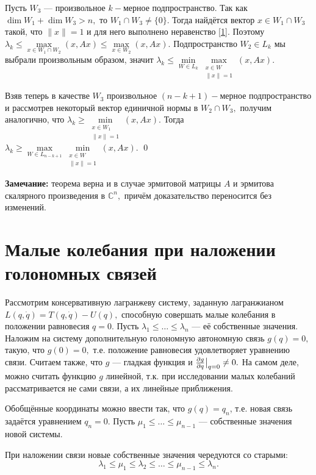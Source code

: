 \documentclass[11pt,a4paper]{article}
\begin{document}
Пусть $W_3$ --- произвольное $k-$мерное подпространство.
Так как $\dim W_1+\dim W_3>n,$ то $W_1\cap W_3\ne\{0\}.$ 
Тогда найдётся вектор $x\in W_1\cap W_3$ такой, что $\|x\|=1$ и 
для него выполнено неравенство \eqref{1}.
Поэтому $\lambda_k\leqslant\max\limits_{x\in W_1\cap W_2}(x,Ax)\leqslant\max\limits_{x\in W_2}(x,Ax).$ 
Подпространство $W_2\in L_k$ мы выбрали произвольным образом, значит $\lambda_k\leqslant\min\limits_{W\in L_{k}}\max\limits_{\substack{x\in W\\\|x\|=1}}(x,Ax).$

Взяв теперь в качестве $W_3$ произвольное $(n-k+1)-$мерное подпространство и рассмотрев некоторый вектор единичной нормы в $W_2\cap W_3,$ получим аналогично, что $\lambda_k\geqslant\min\limits_{\substack{x\in W_1\\\|x\|=1}}(x,Ax).$ Тогда $\lambda_k\geqslant\max\limits_{W\in L_{n-k+1}}\min\limits_{\substack{x\in W\\\|x\|=1}}(x,Ax).$
\qed

\textbf{Замечание:}
теорема верна и в случае эрмитовой матрицы $A$ и эрмитова скалярного произведения в $\mathbb C^n,$ причём доказательство переносится без изменений.
\section{Малые колебания при наложении голономных связей}

Рассмотрим консервативную лагранжеву систему, заданную лагранжианом $L(q,\dot q)=T(q,\dot q)-U(q),$ способную совершать малые колебания в положении равновесия $q=0$. Пусть $\lambda_1\leqslant\ldots\leqslant\lambda_n$ --- её собственные значения. Наложим на систему дополнительную голономную автономную связь $g(q)=0,$ такую, что $g(0)=0,$ т.е. положение равновесия удовлетворяет уравнению связи. Считаем также, что $g$ --- гладкая функция и $\frac{\partial g}{\partial q}\big{|}_{q=0}\ne0.$ На самом деле, можно считать функцию $g$ линейной, т.к. при исследовании малых колебаний рассматривается не сами связи, а их линейные приближения.

Обобщённые координаты можно ввести так, что $g(q)=q_n$, т.е. новая связь задаётся уравнением $q_n=0.$ Пусть $\mu_1\leqslant\ldots\leqslant \mu_{n-1}$ --- собственные значения новой системы.

\begin{theorem} 
При наложении связи новые собственные значения чередуются со старыми: $$\lambda_1\leqslant\mu_1\leqslant\lambda_2\leqslant\ldots\leqslant\mu_{n-1}\leqslant\lambda_n.$$
\end{theorem}
\end{document}
